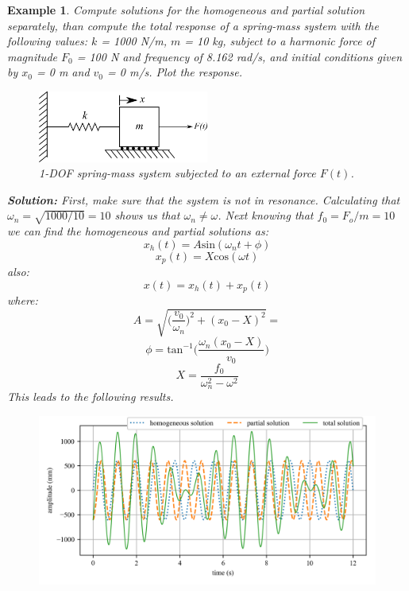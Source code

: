 \documentclass[12pt,letter]{article}
\newtheorem{ex}{Example}
\numberwithin{ex}{section} %
\newenvironment{example}{\begin{mdframed}[middlelinewidth=0.5mm]\begin{ex}\normalfont}{\end{ex}\end{mdframed}}
\numberwithin{re}{section} %
\begin{document}
\begin{example}

			Compute solutions for the homogeneous and partial solution separately, than compute the total response of a spring-mass system with the following values: $k$ = 1000 N/m, $m$ = 10 kg, subject to a harmonic force of magnitude $F_0$ = 100 N and frequency of 8.162 rad/s, and initial conditions given by $x_0$ = 0 m and $v_0$ = 0 m/s. Plot the response.
			
			\begin{figure}[H]
				\centering
				\includegraphics[width=0.5\textwidth]{../Figures/1-DOF-spring_mass_horizontal_forced.png}
				\caption{1-DOF spring-mass system subjected to an external force $F(t)$.}
			\end{figure}
			
			\noindent\textbf{Solution:} First, make sure that the system is not in resonance. Calculating that $\omega_n = \sqrt{1000/10} = 10$ shows us that $\omega_n \neq \omega$. Next knowing that $f_0 = F_o/m = 10$ we can find the homogeneous and partial solutions as:
			\begin{equation}
				x_h(t) = A\text{sin}(\omega_n t + \phi)
			\end{equation}				
			\begin{equation}
				x_p(t) = X\text{cos}(\omega t) 
			\end{equation}	
			also:			
			\begin{equation}
				x(t) = x_h(t) + x_p(t)
			\end{equation}	
			where:			
			\begin{equation}
				A = \sqrt{\bigg(\frac{v_0}{\omega_n}\bigg)^2+(x_0-X)^2} = 
			\end{equation}				
			\begin{equation}
				\phi = \text{tan}^{-1}\bigg(\frac{\omega_n(x_0-X)}{v_0}\bigg)
			\end{equation}				
			\begin{equation}
				X = \frac{f_0}{\omega_n^2-\omega^2}
			\end{equation}			
			This leads to the following results. 
			\begin{figure}[H]
				\centering
				\includegraphics[]{../Figures/topic_6_example_1.png}
			\end{figure}			


\end{example}
\end{document}
